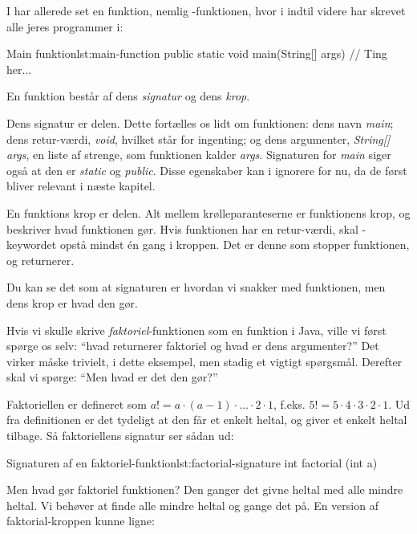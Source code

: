 		I har allerede set en funktion, nemlig -funktionen, hvor i
		indtil videre har skrevet alle jeres programmer i:

		\begin{JavaCode}{Main funktion}{lst:main-function}
			public static void main(String[] args) {
				// Ting her...
			}
		\end{JavaCode}

		En funktion består af dens \emph{signatur} og dens \emph{krop}.

		Dens signatur er  delen.
		Dette fortælles os lidt om funktionen: dens navn \emph{main}; dens
		retur-værdi, \emph{void}, hvilket står for ingenting; og dens argumenter,
		\emph{String[] args}, en liste af strenge, som funktionen kalder \emph{args}.
		Signaturen for \emph{main} siger også at den er \emph{static} og
		\emph{public}. Disse egenskaber kan i ignorere for nu, da de først bliver
		relevant i næste kapitel.

		En funktions krop er  delen. Alt mellem
		krølleparanteserne er funktionens krop, og beskriver hvad funktionen gør.
		Hvis funktionen har en retur-værdi, skal -keywordet opstå
		mindst én gang i kroppen. Det er denne som stopper funktionen, og returnerer.

		Du kan se det som at signaturen er hvordan vi snakker med funktionen, men
		dens krop er hvad den gør.

		Hvis vi skulle skrive \emph{faktoriel}-funktionen som en funktion i Java,
		ville vi først spørge os selv: ``hvad returnerer faktoriel og hvad er dens
		argumenter?'' Det virker måske trivielt, i dette eksempel, men stadig et
		vigtigt spørgsmål. Derefter skal vi spørge: ``Men hvad er det den gør?''

		Faktoriellen er defineret som \(a! = a \cdot (a-1) \cdot \dots \cdot 2 \cdot 1\),
		f.eks. \(5! = 5 \cdot 4 \cdot 3 \cdot 2 \cdot 1\). Ud fra definitionen er det
		tydeligt at den får et enkelt heltal, og giver et enkelt heltal tilbage. Så
		faktoriellens signatur ser sådan ud:

		\begin{JavaCode}{Signaturen af en faktoriel-funktion}{lst:factorial-signature}
			int factorial (int a)
		\end{JavaCode}

		Men hvad gør faktoriel funktionen? Den ganger det givne heltal med alle mindre
		heltal. Vi behøver at finde alle mindre heltal og gange det på. En version
		af faktorial-kroppen kunne ligne:

